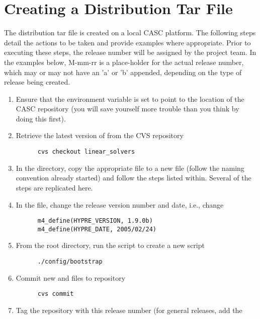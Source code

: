 \section{Creating a Distribution Tar File}
\label{Creating a Distribution Tar File}

The distribution tar file is created on a local CASC platform.  The following
steps detail the actions to be taken and provide examples where appropriate.
Prior to executing these steps, the release number will be assigned by the
project team.  In the examples below, M-mm-rr is a place-holder for the actual
release number, which may or may not have an 'a' or 'b' appended, depending on
the type of release being created.

\begin{enumerate}
\item Ensure that the  environment variable is set to point to the
location of the CASC repository  (you will save
yourself more trouble than you think by doing this first).
\item Retrieve the latest version of \hypre{} from the CVS repository
\begin{verbatim}
      cvs checkout linear_solvers
\end{verbatim}
\item In the  directory, copy the appropriate 
file to a new file (follow the naming convention already started) and follow the
steps listed within.  Several of the steps are replicated here.
\item In the  file, change the release version number
and date, i.e., change
\begin{verbatim}
      m4_define(HYPRE_VERSION, 1.9.0b)
      m4_define(HYPRE_DATE, 2005/02/24)
\end{verbatim}
\item From the root directory, run the  script to create
a new  script
\begin{verbatim}
      ./config/bootstrap
\end{verbatim}
\item Commit new  and  files to repository
\begin{verbatim}
      cvs commit 
\end{verbatim}
\item Tag the repository with this release number (for general releases, add the

\end{enumerate}

